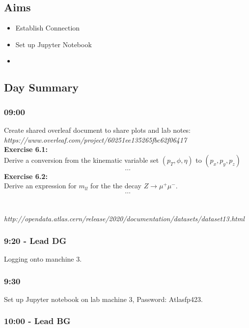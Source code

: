 
\subsection{Aims}
\begin{itemize}
    \item Establish Connection
    \item Set up Jupyter Notebook
    \item
\end{itemize}

\subsection{Day Summary}

\subsubsection*{09:00}
Create shared overleaf document to share plots and lab notes:
\\
\textit{https://www.overleaf.com/project/60251ee135265fbc62f06417}
\\
\textbf{Exercise 6.1:}
\\
Derive a conversion from the kinematic variable set $(p_T, \phi, \eta)$ to $(p_x, p_y, p_z)$
\begin{align}
    \dots
\end{align}
\textbf{Exercise 6.2:}\\
Derive an expression for $m_{ll}$ for the the decay $Z \rightarrow \mu^+ \mu^-$.
\begin{align}
    \dots
\end{align}
\\\\
\textit{http://opendata.atlas.cern/release/2020/documentation/datasets/dataset13.html}

\subsubsection*{\textbf{9:20} - Lead DG}
Logging onto manchine 3.

\subsubsection*{\textbf{9:30}}
Set up Jupyter notebook on lab machine 3, Password: Atlasfp423.

\subsubsection*{\textbf{10:00} - Lead BG}

